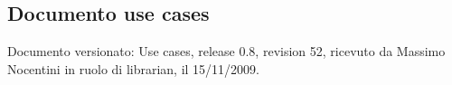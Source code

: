 \subsection{Documento use cases}
Documento versionato: Use cases, release 0.8, revision 52, ricevuto da
Massimo Nocentini in ruolo di librarian, il 15/11/2009.